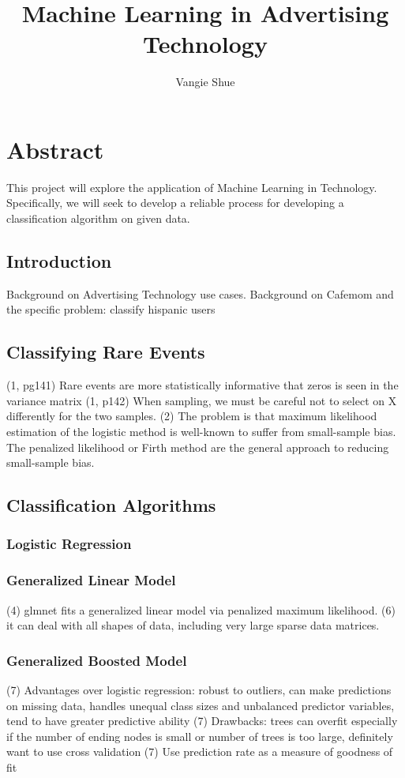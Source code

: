\documentclass[a4paper]{article}
\title{Machine Learning in Advertising Technology}
\author{Vangie Shue}
\begin{document}


\maketitle
\section*{Abstract}
This project will explore the application of Machine Learning in Technology. Specifically, we will seek to develop a reliable process for developing a classification algorithm on given data.

\begin{multicols}{2}

\section*{Introduction}
Background on Advertising Technology use cases.
Background on Cafemom and the specific problem: classify hispanic users

\subsection*{Classifying Rare Events}
(1, pg141) Rare events are more statistically informative that zeros is seen in the variance matrix
(1, p142) When sampling, we must be careful not to select on X differently for the two samples.
(2) The problem is that maximum likelihood estimation of the logistic method is well-known to suffer from small-sample bias. The penalized likelihood or Firth method are the general approach to reducing small-sample bias.

\subsection*{Classification Algorithms}
\subsubsection*{Logistic Regression}
\subsubsection*{Generalized Linear Model}
(4) glmnet fits a generalized linear model via penalized maximum likelihood.
(6) it can deal with all shapes of data, including very large sparse data matrices.
\subsubsection*{Generalized Boosted Model}
(7) Advantages over logistic regression: robust to outliers, can make predictions on missing data, handles unequal class sizes and unbalanced predictor variables, tend to have greater predictive ability
(7) Drawbacks: trees can overfit especially if the number of ending nodes is small or number of trees is too large, definitely want to use cross validation
(7) Use prediction rate as a measure of goodness of fit


\end{multicols}
\end{document}
